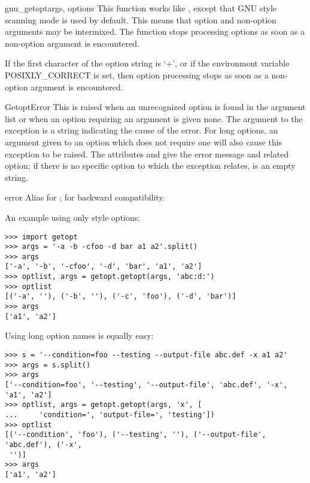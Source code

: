 \begin{funcdesc}{gnu_getopt}{args, options}
This function works like , except that GNU style
scanning mode is used by default. This means that option and
non-option arguments may be intermixed. The 
function stops processing options as soon as a non-option argument is
encountered.

If the first character of the option string is `+', or if the
environment variable POSIXLY_CORRECT is set, then option processing
stops as soon as a non-option argument is encountered.
\end{funcdesc}

\begin{excdesc}{GetoptError}
This is raised when an unrecognized option is found in the argument
list or when an option requiring an argument is given none.
The argument to the exception is a string indicating the cause of the
error.  For long options, an argument given to an option which does
not require one will also cause this exception to be raised.  The
attributes  and  give the error message and
related option; if there is no specific option to which the exception
relates,  is an empty string.

\end{excdesc}

\begin{excdesc}{error}
Alias for ; for backward compatibility.
\end{excdesc}


An example using only \UNIX{} style options:

\begin{verbatim}
>>> import getopt
>>> args = '-a -b -cfoo -d bar a1 a2'.split()
>>> args
['-a', '-b', '-cfoo', '-d', 'bar', 'a1', 'a2']
>>> optlist, args = getopt.getopt(args, 'abc:d:')
>>> optlist
[('-a', ''), ('-b', ''), ('-c', 'foo'), ('-d', 'bar')]
>>> args
['a1', 'a2']
\end{verbatim}

Using long option names is equally easy:

\begin{verbatim}
>>> s = '--condition=foo --testing --output-file abc.def -x a1 a2'
>>> args = s.split()
>>> args
['--condition=foo', '--testing', '--output-file', 'abc.def', '-x', 'a1', 'a2']
>>> optlist, args = getopt.getopt(args, 'x', [
...     'condition=', 'output-file=', 'testing'])
>>> optlist
[('--condition', 'foo'), ('--testing', ''), ('--output-file', 'abc.def'), ('-x',
 '')]
>>> args
['a1', 'a2']
\end{verbatim}

